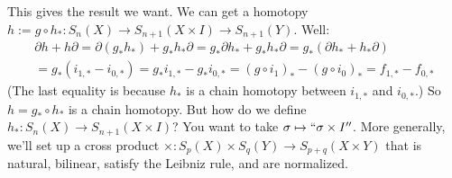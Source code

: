 This gives the result we want. We can get a homotopy $h:=g\circ h_\ast:S_n(X)\to S_{n+1}(X\times I)\to S_{n+1}(Y)$. Well:
		\begin{multline*}
		\partial h + h\partial = \partial(g_\ast h_\ast) + g_\ast h_\ast\partial=g_\ast\partial h_\ast + g_\ast h_\ast \partial = g_\ast(\partial h_\ast + h_\ast\partial)\\
		 = g_\ast(i_{1,\ast} - i_{0,\ast}) = g_\ast i_{1,\ast} - g_\ast i_{0,\ast} = (g\circ i_1)_\ast - (g\circ i_0)_{\ast} = f_{1,\ast} - f_{0,\ast}
		\end{multline*}
(The last equality is because $h_\ast$ is a chain homotopy between $i_{1,\ast}$ and $i_{0,\ast}$.) So $h=g_\ast\circ h_\ast$ is a chain homotopy. But how do we define $h_\ast:S_n(X)\to S_{n+1}(X\times I)$? You want to take $\sigma\mapsto``\sigma\times I''$. More generally, we'll set up a cross product $\times:S_p(X)\times S_q(Y)\to S_{p+q}(X\times Y)$ that is natural, bilinear, satisfy the Leibniz rule, and are normalized.

